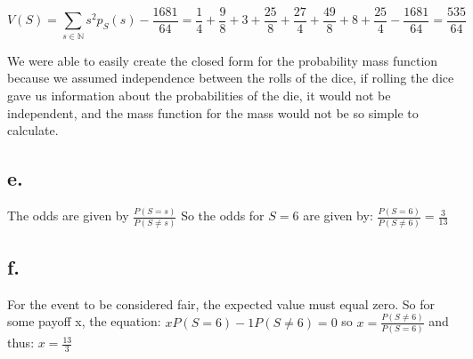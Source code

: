 \documentclass[10pt, letterpaper]{paper}
\begin{document}
$$V(S) = \sum_{ s \in \mathbb{N}}^{} s^2 p_S (s) - \frac{1681}{64} = \frac{1}{4} + \frac{9}{8} + 3 + \frac{25}{8} + \frac{27}{4} + \frac{49}{8} + 8 + \frac{25}{4} - \frac{1681}{64} = \frac{535}{64}$$

We were able to easily create the closed form for the probability mass function because we assumed independence between the rolls of the dice, if rolling the dice gave us information about the probabilities of the die, it would not be independent, and the mass function for the mass would not be so simple to calculate.

\subsection*{e.}
The odds are given by $\frac{P(S=s)}{P( S \neq s )}$ So the odds for $S = 6$ are given by: $\frac{P(S=6)}{P( S \neq 6 )} = \frac{3}{13}$

\subsection*{f.}

For the event to be considered fair, the expected value must equal zero. So for some payoff x, the equation: $ x P(S = 6 ) - 1 P( S \neq 6 ) = 0 $ so $x = \frac{P( S \neq 6)}{P( S = 6 ) }$ and thus: $x = \frac{ 13}{3}$
\end{document}
